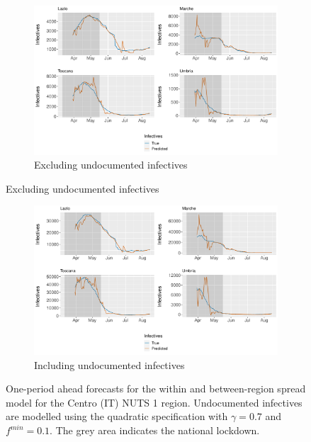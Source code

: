 \documentclass[12pt]{article}
\begin{document}
\begin{appendices}
        \begin{figure}[H]
    	    \centering
    	    \begin{subfigure}{\textwidth}
    	      \centering
    	      \includegraphics[width=0.91\linewidth]{output/model_between_lag14_forecast_start20_Centro (IT)_rolling.pdf}
    	      \caption{Excluding undocumented infectives}
    	      \label{fig:forecast_between_centro_regular}
    	    \end{subfigure}
        \end{figure}
        \begin{figure}[H]\ContinuedFloat
    	    \begin{subfigure}{\textwidth}
    	      \centering
    	      \includegraphics[width=0.91\linewidth]{output/model_between_lag14_forecast_start20_Centro (IT)_UndocQuadratic_rolling.pdf}
    	      \caption{Including undocumented infectives}
    	      \label{fig:forecast_between_centro_undoc}
    	    \end{subfigure}
    	    \caption{One-period ahead forecasts for the within and between-region spread model for the Centro (IT) NUTS 1 region. Undocumented infectives are modelled using the quadratic specification with $\gamma = 0.7$ and $f^{min}=0.1$. The grey area indicates the national lockdown.}
    	    \label{fig:forecast_between_centro}
        \end{figure}
        

\end{appendices}
\end{document}
